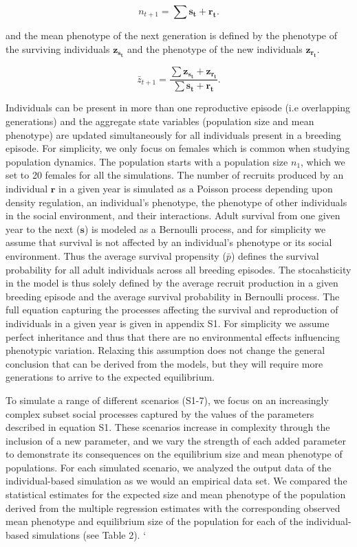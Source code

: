 \documentclass{article}
\begin{document}
\begin{equation} \tag{B3.2}\label{N}
n_{t+1}=\sum \bm{s_{t}} + \bm{r_{t}}.
\end{equation}

and the mean phenotype of the next generation is defined by the phenotype of the surviving individuals $\bm{z_{s_t}}$ and the phenotype of the new individuals  $\bm{z_{r_t}}$.

\begin{equation} \tag{B3.2}\label{N}
\bar{z}_{t+1}=\frac{\sum \bm{z_{s_t}} + \bm{z_{r_t}}}{\sum \bm{s_{t}} + \bm{r_{t}}}.
\end{equation}

Individuals can be present in more than one reproductive episode (i.e overlapping generations) and the aggregate state variables (population size and mean phenotype) are updated simultaneously for all individuals present in a breeding episode. For simplicity, we only focus on females which is common when studying population dynamics. The population starts with a population size $n_{1}$, which we set to 20 females for all the simulations. The number of recruits produced by an individual $\bm{r}$ in a given year is simulated as a Poisson process depending upon density regulation, an individual's phenotype, the phenotype of other individuals in the social environment, and their interactions. Adult survival from one given year to the next ($\bm{s}$) is modeled as a Bernoulli process, and for simplicity we assume that survival is not affected by an individual's phenotype or its social environment. Thus the average survival propensity ($\bar{p}$) defines the survival probability for all adult individuals across all breeding episodes. The stocahsticity in the model is thus solely defined by the average recruit production in a given breeding episode and the average survival probability in Bernoulli process. The full equation capturing the processes affecting the survival and reproduction of individuals in a given year is given in appendix S1. For simplicity we assume perfect inheritance and thus that there are no environmental effects influencing phenotypic variation. Relaxing this assumption does not change the general conclusion that can be derived from the models, but they will require more generations to arrive to the expected equilibrium. 

To simulate a range of different scenarios (S1-7), we focus on an increasingly complex subset social processes captured by the values of the parameters described in equation S1. These scenarios increase in complexity through the inclusion of a new parameter, and we vary the strength of each added parameter to demonstrate its consequences on the equilibrium size and mean phenotype of populations. For each simulated scenario, we analyzed the output data of the individual-based simulation as we would an empirical data set. We compared the statistical estimates for the expected size and mean phenotype of the population derived from the multiple regression estimates with the corresponding observed mean phenotype and equilibrium size of the population for each of the individual-based simulations (see Table 2). 
`
\end{document}
